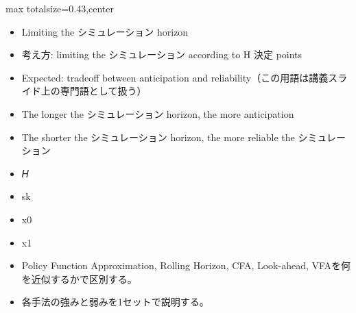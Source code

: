\clearpage
{}
\begin{minipage}[t]{0.405\textwidth}
\begin{adjustbox}{max totalsize={\textwidth}{0.43\textheight},center}
\begin{minipage}{\textwidth}\scriptsize
{}\begin{itemize}
\item Limiting the シミュレーション horizon
\item 考え方: limiting the シミュレーション according to H 決定 points
\item Expected: tradeoff between anticipation and reliability（この用語は講義スライド上の専門語として扱う）
\item The longer the シミュレーション horizon, the more anticipation
\item The shorter the シミュレーション horizon, the more reliable the シミュレーション
\item 𝐻
\item sk
\item x0
\item x1
\end{itemize}\begin{itemize}
\item Policy Function Approximation, Rolling Horizon, CFA, Look-ahead, VFAを何を近似するかで区別する。
\item 各手法の強みと弱みを1セットで説明する。
\end{itemize}
\end{minipage}
\end{adjustbox}
\end{minipage}\hfill
